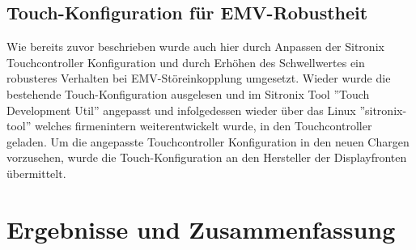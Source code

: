 \documentclass[praktikum,german]{hgbthesis}
\begin{document}
\section{Touch-Konfiguration für EMV-Robustheit}
Wie bereits zuvor beschrieben wurde auch hier durch Anpassen der Sitronix Touchcontroller Konfiguration und durch Erhöhen des Schwellwertes ein robusteres Verhalten bei EMV-Störeinkopplung umgesetzt. Wieder wurde die bestehende Touch-Konfiguration ausgelesen und im Sitronix Tool ''Touch Development Util'' angepasst und infolgedessen wieder über das Linux ''sitronix-tool'' welches firmenintern weiterentwickelt wurde, in den Touchcontroller geladen. Um die angepasste Touchcontroller Konfiguration in den neuen Chargen vorzusehen, wurde die Touch-Konfiguration an den Hersteller der Displayfronten übermittelt.

\chapter{Ergebnisse und Zusammenfassung}



\end{document}
